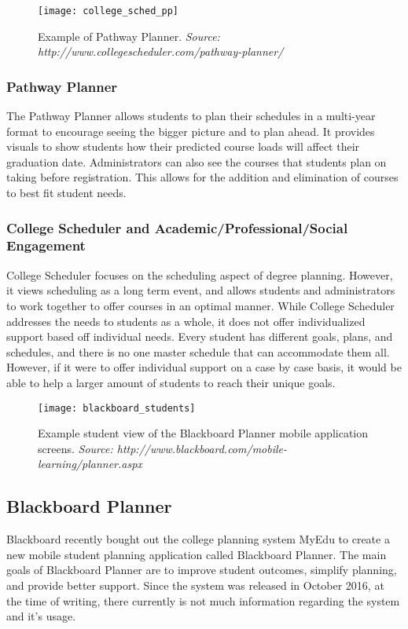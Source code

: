 \begin{figure}[h]
\centering
\texttt{[image: college\_sched\_pp]}
\caption{Example of Pathway Planner. \textit{Source: http://www.collegescheduler.com/pathway-planner/}}
\end{figure}

\subsubsection{Pathway Planner}
The Pathway Planner allows students to plan their schedules in a multi-year format to encourage seeing the bigger picture and to plan ahead. It provides visuals to show students how their predicted course loads will affect their graduation date. Administrators can also see the courses that students plan on taking before registration. This allows for the addition and elimination of courses to best fit student needs. 

\subsubsection{College Scheduler and Academic/Professional/Social Engagement}
College Scheduler focuses on the scheduling aspect of degree planning. However, it views scheduling as a long term event, and allows students and administrators to work together to offer courses in an optimal manner. While College Scheduler addresses the needs to students as a whole, it does not offer individualized support based off individual needs. Every student has different goals, plans, and schedules, and there is no one master schedule that can accommodate them all. However, if it were to offer individual support on a case by case basis, it would be able to help a larger amount of students to reach their unique goals. 

\begin{figure}[h]
\centering
\texttt{[image: blackboard\_students]}
\caption{Example student view of the Blackboard Planner mobile application screens. \textit{Source: http://www.blackboard.com/mobile-learning/planner.aspx}}
\end{figure}
\subsection{Blackboard Planner} 
Blackboard recently bought out the college planning system MyEdu to create a new mobile student planning application called Blackboard Planner. The main goals of Blackboard Planner are to improve student outcomes, simplify planning, and provide better support. Since the system was released in October 2016, at the time of writing, there currently is not much information regarding the system and it's usage.

